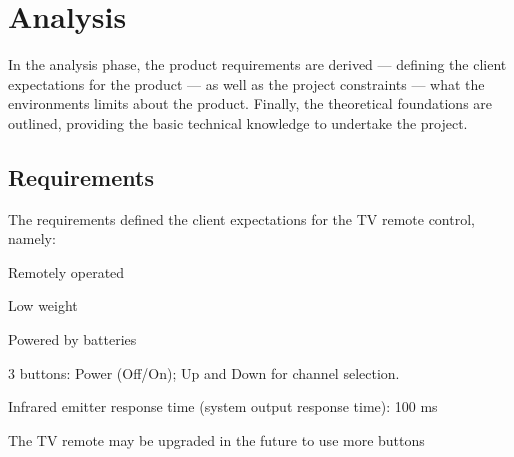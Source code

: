 \chapter{Analysis}
\label{ch:analysis}
In the analysis
phase, the product requirements are derived --- defining the client expectations
for the product --- as well as the project constraints --- what the environments
limits about the product. Finally, the theoretical foundations are outlined,
providing the basic technical knowledge to undertake the project.

\section{Requirements}
\label{sec:requirements}
The requirements defined the client expectations for the TV remote control,
namely:
\begin{item-c}
\item Remotely operated
\item Low weight
\item Powered by batteries
\item 3 buttons: Power (Off/On); Up and Down for channel selection.
\item Infrared emitter response time (system output response time): 100 ms
\item The TV remote may be upgraded in the future to use more buttons
\end{item-c}


